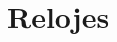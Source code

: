 \documentclass[../candidatura.tex]{subfiles}
\begin{document}
\esborrador

\section{Relojes}

\newpage
\end{document}
